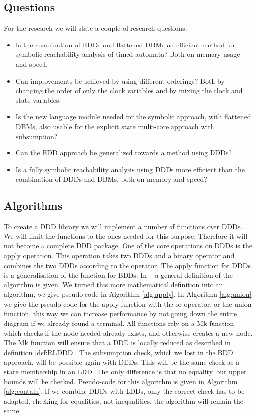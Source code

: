 \subsection{Questions}
For the research we will state a couple of research questions:
{\renewcommand\labelitemi{--}
	\begin{itemize}
		\item Is the combination of BDDs and flattened DBMs an efficient method for symbolic reachability analysis of timed automata? Both on memory usage and speed.
		\item Can improvements be achieved by using different orderings? Both by changing the order of only the clock variables and by mixing the clock and state variables.
		\item Is the new language module needed for the symbolic approach, with flattened DBMs, also usable for the explicit state multi-core approach with subsumption?
		\item Can the BDD approach be generalized towards a method using DDDs?
		\item Is a fully symbolic reachability analysis using DDDs more efficient than the combination of DDDs and DBMs, both on memory and speed?
	\end{itemize}
}

\subsection{Algorithms}
To create a DDD library we will implement a number of functions over DDDs. We will limit the functions to the ones needed for this purpose. Therefore it will not become a complete DDD package. One of the core operations on DDDs is the apply operation. This operation takes two DDDs and a binary operator and combines the two DDDs according to the operator. The apply function for DDDs is a generalisation of the function for BDDs. In ~\cite{ddds} a general definition of the algorithm is given. We turned this more mathematical definition into an algorithm, we give pseudo-code in Algorithm \ref{alg:apply}. In Algorithm \ref{alg:union} we give the pseudo-code for the apply function with the or operator, or the union function, this way we can increase performance by not going down the entire diagram if we already found a terminal. All functions rely on a Mk function which checks if the node needed already exists, and otherwise creates a new node. The Mk function will ensure that a DDD is locally reduced as described in definition \ref{def:RLDDD}.
The subsumption check, which we lost in the BDD approach, will be possible again with DDDs. This will be the same check as a state membership in an LDD. The only difference is that no equality, but upper bounds will be checked. Pseudo-code for this algorithm is given in Algorithm \ref{alg:contain}. If we combine DDDs with LDDs, only the correct check has to be adapted, checking for equalities, not inequalities, the algorithm will remain the same.

